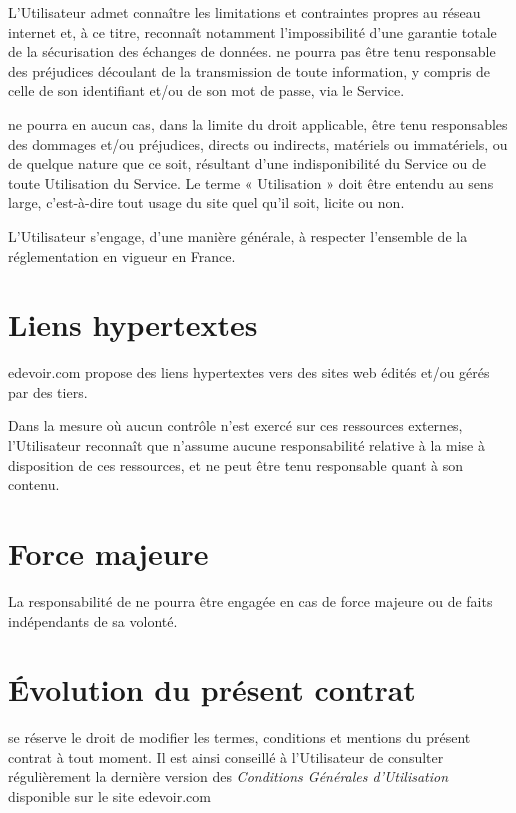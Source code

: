 L'Utilisateur admet connaître les limitations et contraintes propres au réseau internet et, à ce titre, reconnaît notamment l'impossibilité d'une garantie totale de la sécurisation des échanges de données. \eDevoir ne pourra pas être tenu responsable des préjudices découlant de la transmission de toute information, y compris de celle de son identifiant et/ou de son mot de passe, via le Service.

\eDevoir ne pourra en aucun cas, dans la limite du droit applicable, être tenu responsables des dommages et/ou préjudices, directs ou indirects, matériels ou immatériels, ou de quelque nature que ce soit, résultant d'une indisponibilité du Service ou de toute Utilisation du Service. Le terme « Utilisation » doit être entendu au sens large, c'est-à-dire tout usage du site quel qu'il soit, licite ou non.

L'Utilisateur s'engage, d'une manière générale, à respecter l'ensemble de la réglementation en vigueur en France.


\section{Liens hypertextes}

edevoir.com propose des liens hypertextes vers des sites web édités et/ou gérés par des tiers.

Dans la mesure où aucun contrôle n'est exercé sur ces ressources externes, l'Utilisateur reconnaît que \eDevoir n'assume aucune responsabilité relative à la mise à disposition de ces ressources, et ne peut être tenu responsable quant à son contenu.


\section{Force majeure}

La responsabilité de \eDevoir ne pourra être engagée en cas de force majeure ou de faits indépendants de sa volonté.


\section{Évolution du présent contrat}

\eDevoir se réserve le droit de modifier les termes, conditions et mentions du présent contrat à tout moment.
Il est ainsi conseillé à l'Utilisateur de consulter régulièrement la dernière version des \textit{Conditions Générales d'Utilisation} disponible sur le site edevoir.com


